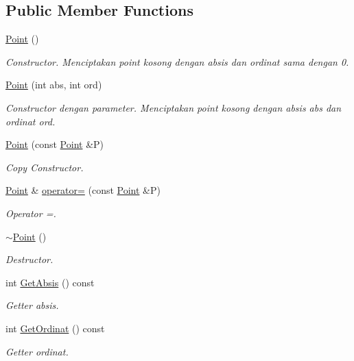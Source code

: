 \subsection*{Public Member Functions}
\begin{DoxyCompactItemize}
\item 
\hyperlink{classPoint_ad92f2337b839a94ce97dcdb439b4325a}{Point} ()
\begin{DoxyCompactList}\small\item\em Constructor. Menciptakan point kosong dengan absis dan ordinat sama dengan 0. \end{DoxyCompactList}\item 
\hyperlink{classPoint_a3634e1e4d94c1268ddaca3909f23b39b}{Point} (int abs, int ord)
\begin{DoxyCompactList}\small\item\em Constructor dengan parameter. Menciptakan point kosong dengan absis abs dan ordinat ord. \end{DoxyCompactList}\item 
\hyperlink{classPoint_a7e32c5a7f878c49ed9f1777b622cc06c}{Point} (const \hyperlink{classPoint}{Point} \&P)
\begin{DoxyCompactList}\small\item\em Copy Constructor. \end{DoxyCompactList}\item 
\hyperlink{classPoint}{Point} \& \hyperlink{classPoint_a24f658e4631df755120d856de77e3cbb}{operator=} (const \hyperlink{classPoint}{Point} \&P)
\begin{DoxyCompactList}\small\item\em Operator =. \end{DoxyCompactList}\item 
\hyperlink{classPoint_a395fa04b4ec126b66fc053f829a30cc1}{$\sim$\+Point} ()
\begin{DoxyCompactList}\small\item\em Destructor. \end{DoxyCompactList}\item 
int \hyperlink{classPoint_af9d064339ffb2f87abb6574dbfc9cdb2}{Get\+Absis} () const 
\begin{DoxyCompactList}\small\item\em Getter absis. \end{DoxyCompactList}\item 
int \hyperlink{classPoint_ace648a3faea60f8102d645d4b5a40b1a}{Get\+Ordinat} () const 
\begin{DoxyCompactList}\small\item\em Getter ordinat. \end{DoxyCompactList}\item 

\end{DoxyCompactItemize}
